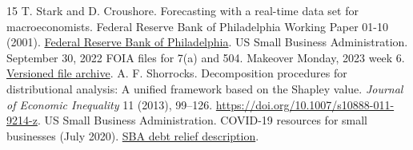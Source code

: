 \begin{thebibliography}{15}
 T. Stark and D. Croushore. Forecasting with a real-time data set for macroeconomists. Federal Reserve Bank of Philadelphia Working Paper 01-10 (2001). \href{https://www.philadelphiafed.org/the-economy/macroeconomics/forecasting-with-a-real-time-data-set-for-macroeconomists}{Federal Reserve Bank of Philadelphia}.
 US Small Business Administration. September 30, 2022 FOIA files for 7(a) and 504. Makeover Monday, 2023 week 6. \href{https://github.com/cmcau/makeover_monday_archive/tree/011e5e1e7d19bc8be7eed43c90403dd87c75f8f0/output/2023/w06}{Versioned file archive}.
 A. F. Shorrocks. Decomposition procedures for distributional analysis: A unified framework based on the Shapley value. \emph{Journal of Economic Inequality} 11 (2013), 99--126. \url{https://doi.org/10.1007/s10888-011-9214-z}.
 US Small Business Administration. COVID-19 resources for small businesses (July 2020). \href{https://www.sba.gov/blog/2020/2020-07/covid-19-resources-small-businesses/}{SBA debt relief description}.
\end{thebibliography}
